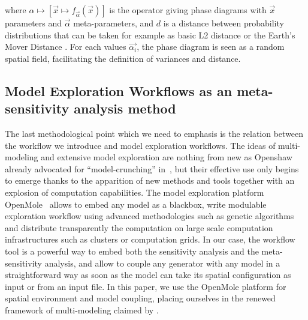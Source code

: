 \documentclass[Afour,sageh,times]{sagej}
\begin{document}
where $\alpha \mapsto \left[\vec{x} \mapsto f_{\vec{\alpha}}\left(\vec{x}\right)\right]$ is the operator giving phase diagrams with $\vec{x}$ parameters and $\vec{\alpha}$ meta-parameters, and $d$ is a distance between probability distributions that can be taken for example as basic L2 distance  or the Earth's Mover Distance . For each values $\vec{\alpha_i}$, the phase diagram is seen as a random spatial field, facilitating the definition of variances and distance.


\subsection{Model Exploration Workflows as an meta-sensitivity analysis method}

The last methodological point which we need to emphasis is the relation between the workflow we introduce and model exploration workflows. The ideas of multi-modeling and extensive model exploration are nothing from new as Openshaw already advocated for ``model-crunching'' in~\cite{openshaw1983data}, but their effective use only begins to emerge thanks to the apparition of new methods and tools together with an explosion of computation capabilities. The model exploration platform OpenMole~\cite{reuillon2013openmole} allows to embed any model as a blackbox, write modulable exploration workflow using advanced methodologies such as genetic algorithms and distribute transparently the computation on large scale computation infrastructures such as clusters or computation grids. In our case, the workflow tool is a powerful way to embed both the sensitivity analysis and the meta-sensitivity analysis, and allow to couple any generator with any model in a straightforward way as soon as the model can take its spatial configuration as input or from an input file.  In this paper, we use the OpenMole platform for spatial environment and model coupling, placing ourselves in the renewed framework of multi-modeling claimed by \cite{cottineau2016back}.

\end{document}
